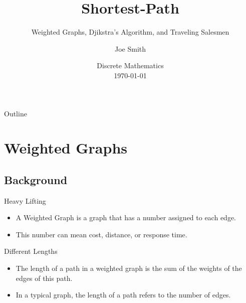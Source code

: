 \documentclass{beamer}
\title[] %
{Shortest-Path}
\subtitle
{Weighted Graphs, Djikstra's Algorithm, and Traveling Salesmen} %
\author{Joe Smith} %
\institute[] %
{
  Department of Computer Science\\
  Chapman University}
\date[] %
{Discrete Mathematics\\ \today}
\begin{document}
\begin{frame}
  \titlepage
\end{frame}

\begin{frame}{Outline}
  \tableofcontents
\end{frame}




\section{Weighted Graphs}

\subsection{Background}

\begin{frame}{Heavy Lifting}

  \begin{itemize}
  \item
    A \alert{Weighted Graph} is a graph that has a number assigned to each edge.
  \item
    This number can mean cost, distance, or response time.
  \end{itemize}
\end{frame}

\begin{frame}{Different Lengths}

  \begin{itemize}
  \item
	The \alert{length} of a path in a weighted graph is the sum of the weights of the edges of this path.
  \item 
	In a typical graph, the \alert{length} of a path refers to the number of edges.
  \end{itemize}
\end{frame}
\end{document}
